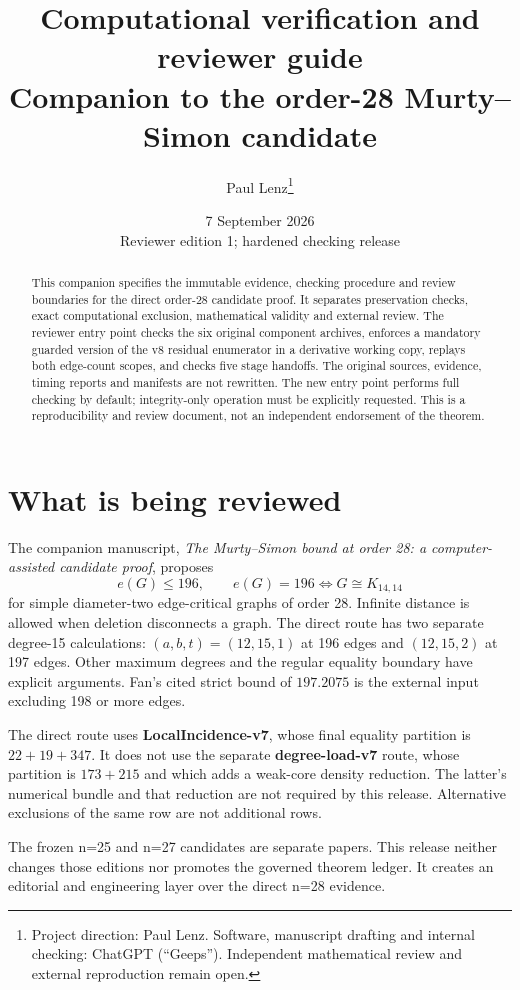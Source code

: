 \documentclass[11pt,a4paper]{article}
\title{Computational verification and reviewer guide\\\large Companion to the order-28 Murty--Simon candidate}
\author{Paul Lenz\thanks{Project direction: Paul Lenz. Software, manuscript drafting and internal checking: ChatGPT (``Geeps''). Independent mathematical review and external reproduction remain open.}}
\date{7 September 2026\\\small Reviewer edition 1; hardened checking release}
\begin{document}
\maketitle
\begin{abstract}
This companion specifies the immutable evidence, checking procedure and review boundaries for the direct order-28 candidate proof. It separates preservation checks, exact computational exclusion, mathematical validity and external review. The reviewer entry point checks the six original component archives, enforces a mandatory guarded version of the v8 residual enumerator in a derivative working copy, replays both edge-count scopes, and checks five stage handoffs. The original sources, evidence, timing reports and manifests are not rewritten. The new entry point performs full checking by default; integrity-only operation must be explicitly requested. This is a reproducibility and review document, not an independent endorsement of the theorem.
\end{abstract}
\bigskip
\section{What is being reviewed}
The companion manuscript, \emph{The Murty--Simon bound at order 28: a computer-assisted candidate proof}, proposes
\[
 e(G)\le196,\qquad e(G)=196\iff G\cong K_{14,14}
\]
for simple diameter-two edge-critical graphs of order 28. Infinite distance is allowed when deletion disconnects a graph. The direct route has two separate degree-15 calculations: $(a,b,t)=(12,15,1)$ at 196 edges and $(12,15,2)$ at 197 edges. Other maximum degrees and the regular equality boundary have explicit arguments. Fan's cited strict bound of $197.2075$ is the external input excluding 198 or more edges.

The direct route uses \textbf{LocalIncidence-v7}, whose final equality partition is $22+19+347$. It does not use the separate \textbf{degree-load-v7} route, whose partition is $173+215$ and which adds a weak-core density reduction. The latter's numerical bundle and that reduction are not required by this release. Alternative exclusions of the same row are not additional rows.

The frozen n=25 and n=27 candidates are separate papers. This release neither changes those editions nor promotes the governed theorem ledger. It creates an editorial and engineering layer over the direct n=28 evidence.
\end{document}

